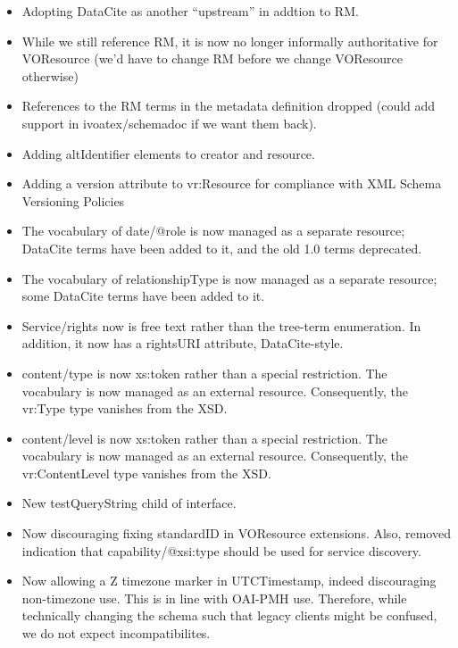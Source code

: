 \documentclass[11pt,a4paper]{ivoa}
\begin{document}
\begin{itemize}
\item Adopting DataCite as another ``upstream'' in addtion to RM.

\item While we still reference RM, it is now no longer informally
authoritative for VOResource (we'd have to change RM before we change
VOResource otherwise)

\item References to the RM terms in the metadata definition dropped
(could add support in ivoatex/schemadoc if we want them back).


\item Adding altIdentifier elements to creator and resource.

\item Adding a version attribute to vr:Resource for compliance with XML
Schema Versioning Policies

\item The vocabulary of date/@role is now managed as a separate
resource; DataCite terms have been added to it, and the old 1.0 terms
deprecated.

\item The vocabulary of relationshipType is now managed as a separate
resource; some DataCite terms have been added to it.

\item Service/rights now is free text rather than the tree-term
enumeration.  In addition, it now has a rightsURI attribute,
DataCite-style.

\item content/type is now xs:token rather than a special restriction.
The vocabulary is now managed as an external resource.
Consequently, the vr:Type type vanishes from the XSD.

\item content/level is now xs:token rather than a special restriction.
The vocabulary is now managed as an external resource.
Consequently, the vr:ContentLevel type vanishes from the XSD.

\item New testQueryString child of interface.

\item Now discouraging fixing standardID in VOResource extensions.
Also, removed indication that capability/@xsi:type should be used for
service discovery.

\item Now allowing a Z timezone marker in UTCTimestamp, indeed
discouraging non-timezone use.  This is in line with OAI-PMH use.
Therefore, while technically changing the schema such that legacy
clients  might be confused, we do not expect incompatibilites.


\end{itemize}
\end{document}
